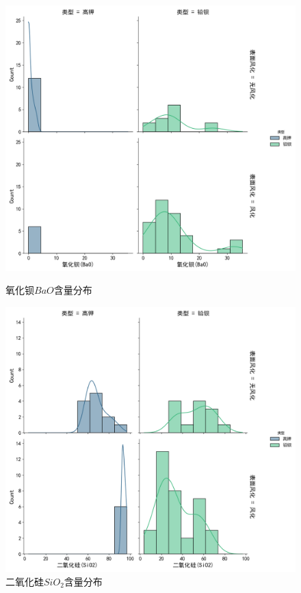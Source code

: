 \begin{figure}[H]
	\centering
	\begin{minipage}{0.48\textwidth}
		\centering
		\includegraphics[width=\linewidth]{figs/3问题一/分布图_氧化钡(BaO).png}
		\caption{氧化钡$BaO$含量分布}
		\label{fig:bao_dist}
	\end{minipage}\hfill
	\begin{minipage}{0.48\textwidth}
		\centering
		\includegraphics[width=\linewidth]{figs/3问题一/分布图_二氧化硅(SiO2).png}
		\caption{二氧化硅$SiO_2$含量分布}
		\label{fig:sio2_dist}
	\end{minipage}
\end{figure}

